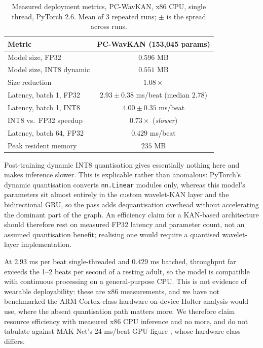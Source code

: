 \documentclass[journal,twoside,web]{ieeecolor}
\begin{document}
\begin{table}[!t]
\centering
\caption{Measured deployment metrics, PC-WavKAN, x86 CPU, single thread, PyTorch 2.6. Mean of 3 repeated runs; $\pm$ is the spread across runs.}
\label{tab:deployment}
\footnotesize
\begin{tabular}{l c}
\toprule
\textbf{Metric} & \textbf{PC-WavKAN (153,045 params)} \\ \midrule
Model size, FP32 & $0.596$ MB \\
Model size, INT8 dynamic & $0.551$ MB \\
Size reduction & $1.08\times$ \\
Latency, batch 1, FP32 & $2.93\pm0.38$ ms/beat (median $2.78$) \\
Latency, batch 1, INT8 & $4.00\pm0.35$ ms/beat \\
INT8 vs.\ FP32 speedup & $0.73\times$ (\emph{slower}) \\
Latency, batch 64, FP32 & $0.429$ ms/beat \\
Peak resident memory & $235$ MB \\ \bottomrule
\end{tabular}
\end{table}

Post-training dynamic INT8 quantisation gives essentially nothing here and makes inference slower. This is explicable rather than anomalous: PyTorch's dynamic quantisation converts \texttt{nn.Linear} modules only, whereas this model's parameters sit almost entirely in the custom wavelet-KAN layer and the bidirectional GRU, so the pass adds dequantisation overhead without accelerating the dominant part of the graph. An efficiency claim for a KAN-based architecture should therefore rest on measured FP32 latency and parameter count, not an assumed quantisation benefit; realising one would require a quantised wavelet-layer implementation.

At $2.93$ ms per beat single-threaded and $0.429$ ms batched, throughput far exceeds the 1--2 beats per second of a resting adult, so the model is compatible with continuous processing on a general-purpose CPU. This is not evidence of wearable deployability: these are x86 measurements, and we have not benchmarked the ARM Cortex-class hardware on-device Holter analysis would use, where the absent quantisation path matters more. We therefore claim resource efficiency with measured x86 CPU inference and no more, and do not tabulate against MAK-Net's 24 ms/beat GPU figure \cite{zhao_mak-net_2025}, whose hardware class differs.
\end{document}

